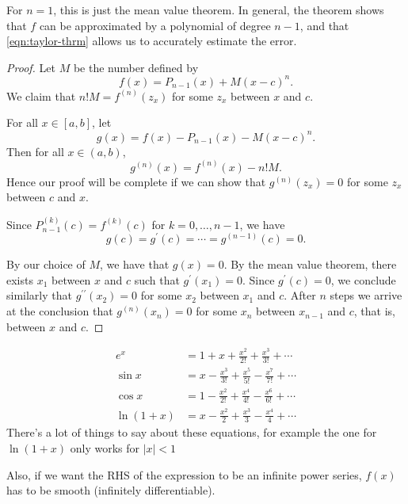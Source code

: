 For $n=1$, this is just the mean value theorem. In general, the theorem shows that $f$ can be approximated by a polynomial of degree $n-1$, and that \cref{eqn:taylor-thrm} allows us to accurately estimate the error.

\begin{proof}
Let $M$ be the number defined by
\[f(x)=P_{n-1}(x)+M(x-c)^n.\]
We claim that $n!M=f^{(n)}(z_x)$ for some $z_x$ between $x$ and $c$.

For all $x\in[a,b]$, let
\[g(x)=f(x)-P_{n-1}(x)-M(x-c)^n.\]
Then for all $x\in(a,b)$,
\[g^{(n)}(x)=f^{(n)}(x)-n!M.\]
Hence our proof will be complete if we can show that $g^{(n)}(z_x)=0$ for some $z_x$ between $c$ and $x$.

Since $P_{n-1}^{(k)}(c)=f^{(k)}(c)$ for $k=0,\dots,n-1$, we have
\[g(c)=g^\prime(c)=\cdots=g^{(n-1)}(c)=0.\]

By our choice of $M$, we have that $g(x)=0$. By the mean value theorem, there exists $x_1$ between $x$ and $c$ such that $g^\prime(x_1)=0$. Since $g^\prime(c)=0$, we conclude similarly that $g^{\prime\prime}(x_2)=0$ for some $x_2$ between $x_1$ and $c$. After $n$ steps we arrive at the conclusion that $g^{(n)}(x_n)=0$ for some $x_n$ between $x_{n-1}$ and $c$, that is, between $x$ and $c$.
\end{proof}

\begin{example}
\begin{align*}
e^x &= 1+x+\frac{x^2}{2!}+\frac{x^3}{3!}+\cdots \\
\sin x &= x-\frac{x^3}{3!}+\frac{x^5}{5!}-\frac{x^7}{7!}+\cdots \\
\cos x &= 1-\frac{x^2}{2!}+\frac{x^4}{4!}-\frac{x^6}{6!}+\cdots \\
\ln(1+x) &= x-\frac{x^2}{2}+\frac{x^3}{3}-\frac{x^4}{4}+\cdots
\end{align*}
There's a lot of things to say about these equations, for example the one for $\ln(1+x)$ only works for $|x|<1$

Also, if we want the RHS of the expression to be an infinite power series, $f(x)$ has to be smooth (infinitely differentiable).
\end{example}

